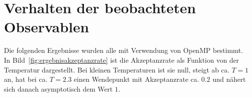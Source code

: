 %		
	

	
	
	
	\section{Verhalten der beobachteten Observablen}
	\label{sec:ergebnisobservablen}
	
	Die folgenden Ergebnisse wurden alle mit Verwendung von OpenMP bestimmt.
	In Bild~\ref{fig:ergebnisakzeptanzrate} ist die Akzeptanzrate als Funktion von der Temperatur dargestellt. Bei kleinen Temperaturen ist sie null, steigt ab ca. $T=1$ an, hat bei ca. $T=\num{2,3}$ einen Wendepunkt mit Akzeptanzrate ca. $\num{0,2}$ und nähert sich danach asymptotisch dem Wert $1$. 
	
